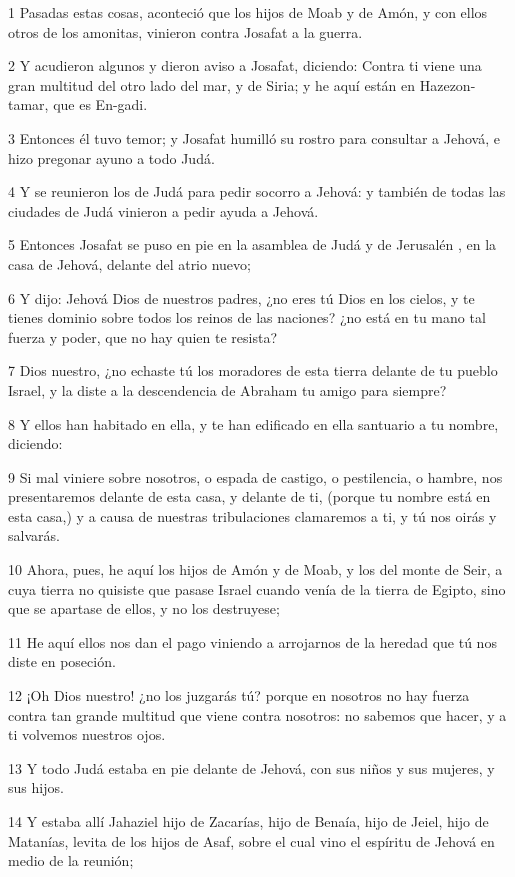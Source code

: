 \par 1 Pasadas estas cosas, aconteció que los hijos de Moab y de Amón, y con ellos otros de los amonitas, vinieron contra Josafat a la guerra.
\par 2 Y acudieron algunos y dieron aviso a Josafat, diciendo: Contra ti viene una gran multitud del otro lado del mar, y de Siria; y he aquí están en Hazezon-tamar, que es En-gadi.
\par 3 Entonces él tuvo temor; y Josafat humilló su rostro para consultar a Jehová, e hizo pregonar ayuno a todo Judá.
\par 4 Y se reunieron los de Judá para pedir socorro a Jehová: y también de todas las ciudades de Judá vinieron a pedir ayuda a Jehová.
\par 5 Entonces Josafat se puso en pie en la asamblea de Judá y de Jerusalén , en la casa de Jehová, delante del atrio nuevo;
\par 6 Y dijo: Jehová Dios de nuestros padres, ¿no eres tú Dios en los cielos, y te tienes dominio sobre todos los reinos de las naciones? ¿no está en tu mano tal fuerza y poder, que no hay quien te resista?
\par 7 Dios nuestro, ¿no echaste tú los moradores de esta tierra delante de tu pueblo Israel, y la diste a la descendencia de Abraham tu amigo para siempre?
\par 8 Y ellos han habitado en ella, y te han edificado en ella santuario a tu nombre, diciendo:
\par 9 Si mal viniere sobre nosotros, o espada de castigo, o pestilencia, o hambre, nos presentaremos delante de esta casa, y delante de ti, (porque tu nombre está en esta casa,) y a causa de nuestras tribulaciones clamaremos a ti, y tú nos oirás y salvarás.
\par 10 Ahora, pues, he aquí los hijos de Amón y de Moab, y los del monte de Seir, a cuya tierra no quisiste que pasase Israel cuando venía de la tierra de Egipto, sino que se apartase de ellos, y no los destruyese;
\par 11 He aquí ellos nos dan el pago viniendo a arrojarnos de la heredad que tú nos diste en poseción.
\par 12 ¡Oh Dios nuestro! ¿no los juzgarás tú? porque en nosotros no hay fuerza contra tan grande multitud que viene contra nosotros: no sabemos que hacer, y a ti volvemos nuestros ojos.
\par 13 Y todo Judá estaba en pie delante de Jehová, con sus niños y sus mujeres, y sus hijos.
\par 14 Y estaba allí Jahaziel hijo de Zacarías, hijo de Benaía, hijo de Jeiel, hijo de Matanías, levita de los hijos de Asaf, sobre el cual vino el espíritu de Jehová en medio de la reunión;
